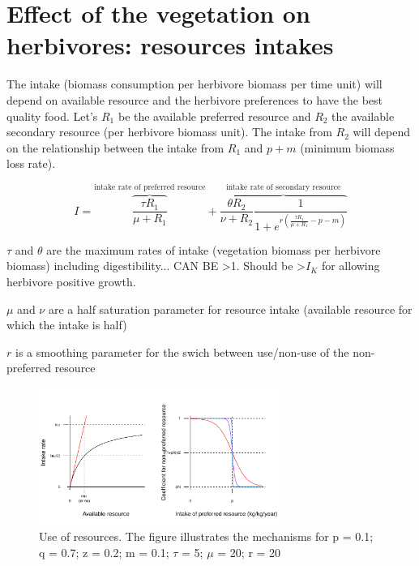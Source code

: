\newpage


\section{Effect of the vegetation on herbivores: resources intakes}

The intake (biomass consumption per herbivore biomass per time unit) will
depend on available resource and the herbivore preferences to have the best
quality food. Let's $R_1$ be the available preferred resource and $R_2$ the
available secondary resource (per herbivore biomass unit). The intake from
$R_2$ will depend on the relationship between the intake from $R_1$ and $p+m$
(minimum biomass loss rate).

\[
I = \overbrace{\frac{\tau R_1}{\mu+R_1}}^\text{intake rate of preferred resource} 
+ \overbrace{\frac{\theta R_2}{\nu+R_2}\frac{1}{1+e^{r(\frac{\tau R_1}{\mu+R_1} - p - m)}}}^\text{intake rate of secondary resource} 
\]

$\tau$ and $\theta$ are the maximum rates of intake (vegetation biomass per
herbivore biomass) including digestibility... CAN BE >1. Should be >$I_K$ for
allowing herbivore positive growth.

$\mu$ and $\nu$ are a half saturation parameter for resource intake (available
resource for which the intake is half)

$r$ is a smoothing parameter for the swich between use/non-use of the non-
preferred resource


\begin{figure}
\includegraphics[width=0.7\textwidth]{../graphs/intakes.pdf}
   
   \caption{Use of resources. The figure illustrates the mechanisms for p = 0.1; q = 0.7; z = 0.2; m = 0.1; $\tau$ = 5; $\mu$ = 20; r = 20}
\label{resources}
\end{figure}

